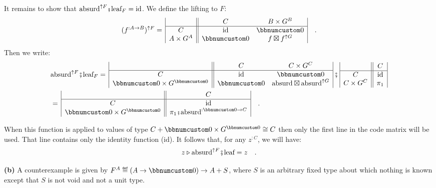It remains to show that $\text{absurd}^{\uparrow F}\bef\text{leaf}_{F}=\text{id}$.
We define the lifting to $F$:
\[
(f^{:A\rightarrow B})^{\uparrow F}=\,\begin{array}{|c||cc|}
 & C & B\times G^{B}\\
\hline C & \text{id} & \bbnum 0\\
A\times G^{A} & \bbnum 0 & f\boxtimes f^{\uparrow G}
\end{array}\quad.
\]
Then we write:
\begin{align*}
 & \text{absurd}^{\uparrow F}\bef\text{leaf}_{F}=\,\begin{array}{|c||cc|}
 & C & C\times G^{C}\\
\hline C & \text{id} & \bbnum 0\\
\bbnum 0\times G^{\bbnum 0} & \bbnum 0 & \text{absurd}\boxtimes\text{absurd}^{\uparrow G}
\end{array}\,\bef\,\begin{array}{|c||c|}
 & C\\
\hline C & \text{id}\\
C\times G^{C} & \pi_{1}
\end{array}\\
 & =\,\begin{array}{|c||c|}
 & C\\
\hline C & \text{id}\\
\bbnum 0\times G^{\bbnum 0} & \pi_{1}\bef\text{absurd}^{:\bbnum 0\rightarrow C}
\end{array}\quad.
\end{align*}

When this function is applied to values of type $C+\bbnum 0\times G^{\bbnum 0}\cong C$
then only the first line in the code matrix will be used. That line
contains only the identity function ($\text{id}$). It follows that,
for any $z^{:C}$, we will have:
\[
z\triangleright\text{absurd}^{\uparrow F}\bef\text{leaf}=z\quad.
\]

\textbf{(b)} A counterexample is given by $F^{A}\triangleq(A\rightarrow\bbnum 0)\rightarrow A+S$,
where $S$ is an arbitrary fixed type about which nothing is known
except that $S$ is not void and not a unit type. 

